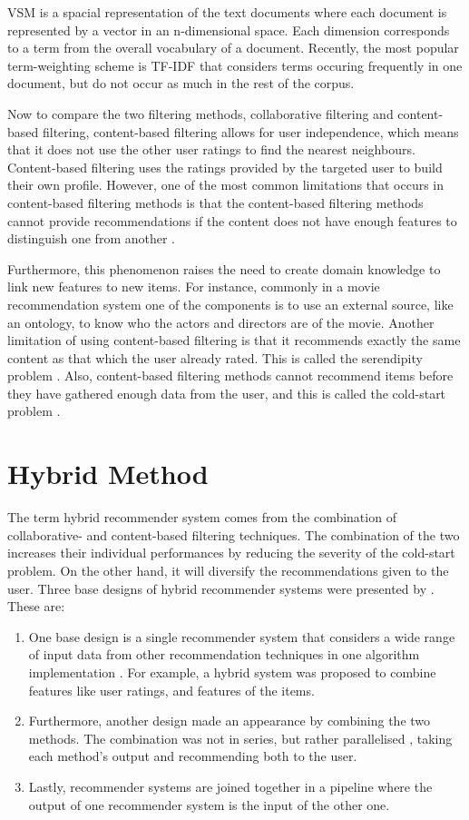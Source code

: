 VSM is a spacial representation of the text documents where each document is represented by a vector in an n-dimensional space. Each dimension corresponds to a term from the overall vocabulary of a document. Recently, the most popular term-weighting scheme is TF-IDF that considers terms occuring frequently in one document, but do not occur as much in the rest of the corpus.

Now to compare the two filtering methods, collaborative filtering and content-based filtering, content-based filtering allows for user independence, which means that it does not use the other user ratings to find the nearest neighbours. Content-based filtering uses the ratings provided by the targeted user to build their own profile. However, one of the most common limitations that occurs in content-based filtering methods is that the content-based filtering methods cannot provide recommendations if the content does not have enough features to distinguish one from another \cite{lops2011content}.

Furthermore, this phenomenon raises the need to create domain knowledge to link new features to new items. For instance, commonly in a movie recommendation system one of the components is to use an external source, like an ontology, to know who the actors and directors are of the movie. Another limitation of using content-based filtering is that it recommends exactly the same content as that which the user already rated. This is called the serendipity problem \cite{DEGEMMIS2015695}. Also, content-based filtering methods cannot recommend items before they have gathered enough data from the user, and this is called the cold-start problem \cite{LIKA20142065}.


\section{Hybrid Method}
The term hybrid recommender system comes from the combination of collaborative- and content-based filtering techniques. The combination of the two increases their individual performances by reducing the severity of the cold-start problem. On the other hand, it will diversify the recommendations given to the user. Three base designs of hybrid recommender systems were presented by . These are:

\begin{enumerate}
    \item One base design is a single recommender system that considers a wide range of input data from other recommendation techniques in one algorithm implementation \cite{dong2017hybrid}. For example, a hybrid system was proposed to combine features like user ratings, and features of the items.
    \item Furthermore, another design made an appearance by combining the two methods. The combination was not in series, but rather parallelised \cite{sharma2016evolution}, taking each method’s output and recommending both to the user.
    \item Lastly, recommender systems are joined together in a pipeline where the output of one recommender system is the input of the other one.
\end{enumerate}

